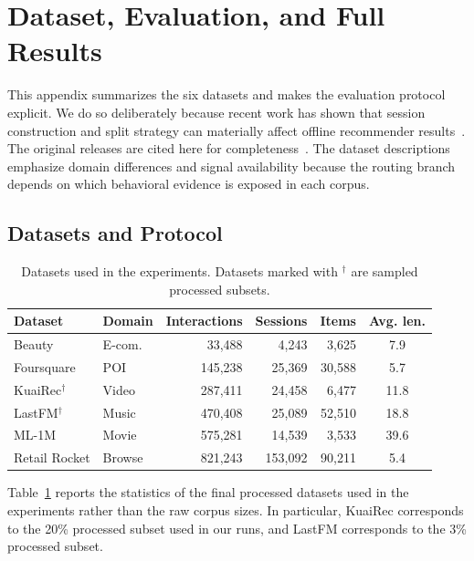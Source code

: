 \documentclass[sigconf,review,anonymous]{acmart}
\begin{document}



\nobalance
\clearpage
\appendix

\section{Dataset, Evaluation, and Full Results}
\label{app:data-details}
This appendix summarizes the six datasets and makes the evaluation protocol explicit. We do so deliberately because recent work has shown that session construction and split strategy can materially affect offline recommender results~\cite{ji2023leakage,gusak2025timesplit}. The original releases are cited here for completeness~\cite{mcauley2015amazon,yang2010foursquare,gao2022kuairec,celma2010music,harper2015movielens,retailrocket2015dataset}. The dataset descriptions emphasize domain differences and signal availability because the routing branch depends on which behavioral evidence is exposed in each corpus.

\subsection{Datasets and Protocol}

\begin{table}[t]
  \caption{Datasets used in the experiments. Datasets marked with $^\dagger$ are sampled processed subsets.}
  \label{tab:appendix-datasets}
  \centering
  \footnotesize
  \setlength{\tabcolsep}{3.0pt}
  \begin{tabular*}{\columnwidth}{@{\extracolsep{\fill}}llrrrc@{}}
    \toprule
    Dataset & Domain & Interactions & Sessions & Items & Avg. len. \\
    \midrule
    Beauty & E-com. & 33,488 & 4,243 & 3,625 & 7.9 \\
    Foursquare & POI & 145,238 & 25,369 & 30,588 & 5.7 \\
    KuaiRec$^\dagger$ & Video & 287,411 & 24,458 & 6,477 & 11.8 \\
    LastFM$^\dagger$ & Music & 470,408 & 25,089 & 52,510 & 18.8 \\
    ML-1M & Movie & 575,281 & 14,539 & 3,533 & 39.6 \\
    Retail Rocket & Browse & 821,243 & 153,092 & 90,211 & 5.4 \\
    \bottomrule
  \end{tabular*}
\end{table}

Table~\ref{tab:appendix-datasets} reports the statistics of the final processed datasets used in the experiments rather than the raw corpus sizes. In particular, KuaiRec corresponds to the 20\% processed subset used in our runs, and LastFM corresponds to the 3\% processed subset.
\end{document}
